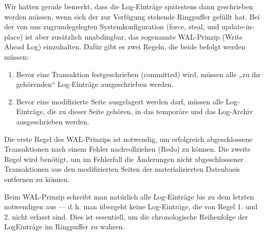 \documentclass{lehramt-informatik-haupt}
\begin{document}
Wir hatten gerade bemerkt, dass die Log-Einträge spätestens dann
geschrieben werden müssen, wenn sich der zur Verfügung stehende
Ringpuffer gefüllt hat. Bei der von uns zugrundegelegten
Systemkonfiguration (force, steal, und update-in-place) ist aber
zusätzlich unabdingbar, das sogenannte WAL-Prinzip (Write Ahead Log)
einzuhalten. Dafür gibt es zwei Regeln, die beide befolgt werden müssen:

\begin{enumerate}
\item Bevor eine Transaktion festgeschrieben (committed) wird, müssen
alle „zu ihr gehörenden“ Log-Einträge ausgeschrieben werden.

\item Bevor eine modifizierte Seite ausgelagert werden darf, müssen alle
Log-Einträge, die zu dieser Seite gehören, in das temporäre und das
Log-Archiv ausgeschrieben werden.
\end{enumerate}

Die erste Regel des WAL-Prinzips ist notwendig, um erfolgreich
abgeschlossene Transaktionen nach einem Fehler nachvollziehen (Redo) zu
können. Die zweite Regel wird benötigt, um im Fehlerfall die Änderungen
nicht abgeschlossener Transaktionen aus den modifizierten Seiten der
materialisierten Datenbasis entfernen zu können.

Beim WAL-Prinzip schreibt man natürlich alle Log-Einträge bis zu dem
letzten notwendigen aus — d.\,h. man übergeht keine Log-Einträge, die von
Regel 1. und 2. nicht erfasst sind. Dies ist essentiell, um die
chronologische Reihenfolge der LogEinträge im Ringpuffer zu wahren.

\literatur
\end{document}
